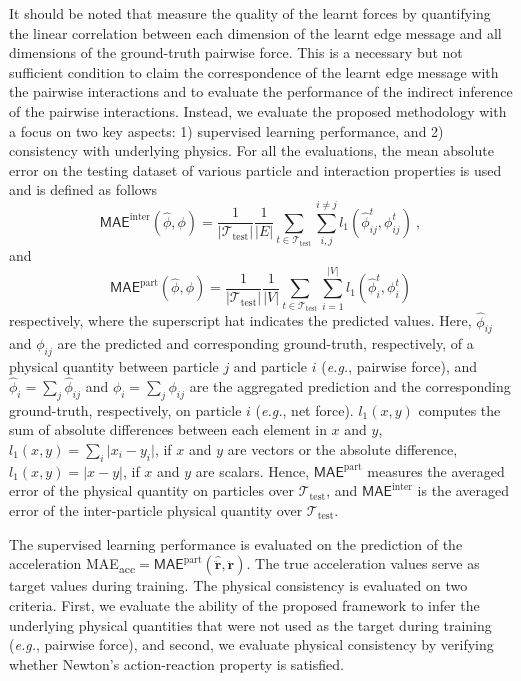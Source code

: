 \documentclass{article}
\newcommand{\abs}[1]{\lvert #1 \rvert}
\begin{document}
{It should be noted that \cite{cranmer2020discovering} measure the quality of the learnt forces by quantifying the linear correlation between each dimension of the learnt edge message and all dimensions of the ground-truth pairwise force. This is a necessary but not sufficient condition to claim the correspondence of the learnt edge message with the pairwise interactions and to evaluate the performance of the indirect inference of the pairwise interactions. }
Instead, we evaluate the proposed methodology with a focus on two key aspects: 1) supervised learning performance, and 2) consistency with underlying physics. For all the evaluations, the mean absolute error on the testing dataset of various particle and interaction properties is used and is defined as follows
\begin{equation}
    \textsf{MAE}^{\mathrm{inter}} (\hat{\phi}, \phi) = \frac{1}{|\mathcal{T}_{\text{test}}|} \frac{1}{|E|}  \sum_{t\in \mathcal{T}_{\text{test}}}\sum_{i,j}^{i\neq j} l_1(\hat{\phi}_{ij}^t,\phi_{ij}^t) ~,
\end{equation}
and
\begin{equation}
    \textsf{MAE}^{\mathrm{part}} (\hat{\phi}, \phi) = \frac{1}{|\mathcal{T}_{\text{test}}|} \frac{1}{|V|} \sum_{t \in \mathcal{T}_{\text{test}}} \sum_{i=1}^{|V|} l_1(\hat{\phi}_i^t,\phi_i^t)
    \label{eq:mae_particle}
\end{equation}
respectively, where the superscript hat indicates the predicted values. Here, $\hat{\phi}_{ij}$ and ${\phi}_{ij}$ are the predicted and corresponding ground-truth, respectively, of a physical quantity between particle $j$ and particle $i$ (\textit{e.g.}, pairwise force), and $\hat{\phi}_{i} = \sum_j \hat{\phi}_{ij}$ and ${\phi}_{i} = \sum_j {\phi}_{ij}$ are the aggregated prediction and the corresponding ground-truth, respectively, on particle $i$ (\textit{e.g.}, net force). $l_1(x, y)$ computes the sum of absolute differences between each element in $x$ and $y$, $l_1(x, y) = \sum_i\abs{x_i-y_i}$, if $x$ and $y$ are vectors or the absolute difference, $l_1(x, y)=\abs{x-y}$, if $x$ and $y$ are scalars. Hence, $\textsf{MAE}^{\mathrm{part}}$ measures the averaged error of the physical quantity on particles over $\mathcal{T}_{\text{test}}$, and  $\textsf{MAE}^{\mathrm{inter}}$ is the averaged error of the inter-particle physical quantity over $\mathcal{T}_{\text{test}}$.

The supervised learning performance is evaluated on the prediction of the acceleration \textsf{MAE\textsubscript{acc}}$= \textsf{MAE}^{\mathrm{part}}(\bm{\hat{\ddot{r}}},\bm{\ddot{r}})$. The true acceleration values serve as target values during training. The physical consistency is evaluated on two criteria. First, we evaluate the ability of the proposed framework to infer the underlying physical quantities that were not used as the target during training (\textit{e.g.},  pairwise force), and second, we evaluate physical consistency by verifying whether Newton's action-reaction property is satisfied.
\end{document}
